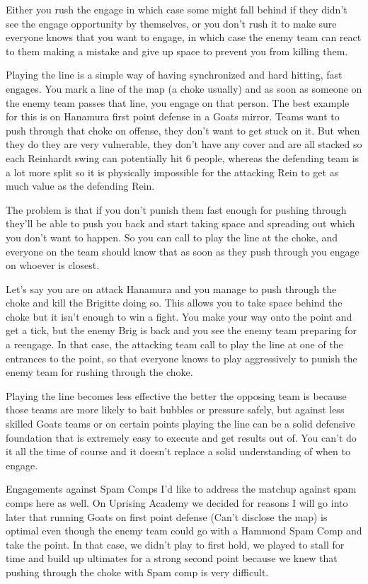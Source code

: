Either you rush the engage in which case some might fall behind if they didn’t see the engage opportunity by themselves, or you don’t rush it to make sure everyone knows that you want to engage, in which case the enemy team can react to them making a mistake and give up space to prevent you from killing them.

Playing the line is a simple way of having synchronized and hard hitting, fast engages. You mark a line of the map (a choke usually) and as soon as someone on the enemy team passes that line, you engage on that person. The best example for this is on Hanamura first point defense in a Goats mirror. Teams want to push through that choke on offense, they don't want to get stuck on it. But when they do they are very vulnerable, they don’t have any cover and are all stacked so each Reinhardt swing can potentially hit 6 people, whereas the defending team is a lot more split so it is physically impossible for the attacking Rein to get as much value as the defending Rein.

The problem is that if you don’t punish them fast enough for pushing through they’ll be able to push you back and start taking space and spreading out which you don’t want to happen. So you can call to play the line at the choke, and everyone on the team should know that as soon as they push through you engage on whoever is closest.

Let’s say you are on attack Hanamura and you manage to push through the choke and kill the Brigitte doing so. This allows you to take space behind the choke but it isn’t enough to win a fight. You make your way onto the point and get a tick, but the enemy Brig is back and you see the enemy team preparing for a reengage. In that case, the attacking team call to play the line at one of the entrances to the point, so that everyone knows to play aggressively to punish the enemy team for rushing through the choke.

Playing the line becomes less effective the better the opposing team is because those teams are more likely to bait bubbles or pressure safely, but against less skilled Goats teams or on certain points playing the line can be a solid defensive foundation that is extremely easy to execute and get results out of. You can’t do it all the time of course and it doesn’t replace a solid understanding of when to engage.

Engagements against Spam Comps
I’d like to address the matchup against spam comps here as well. On Uprising Academy we decided for reasons I will go into later that running Goats on first point defense (Can’t disclose the map) is optimal even though the enemy team could go with a Hammond Spam Comp and take the point. In that case, we didn’t play to first hold, we played to stall for time and build up ultimates for a strong second point because we knew that pushing through the choke with Spam comp is very difficult.

